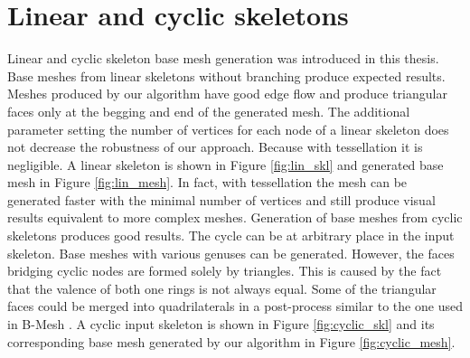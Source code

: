 \section{Linear and cyclic skeletons}

Linear and cyclic skeleton base mesh generation was introduced in this thesis.
Base meshes from linear skeletons without branching produce expected results.
Meshes produced by our algorithm have good edge flow and produce triangular faces only at the begging and end of the generated mesh.
The additional parameter setting the number of vertices for each node of a linear skeleton does not decrease the robustness of our approach.
Because with tessellation it is negligible.
A linear skeleton is shown in Figure \ref{fig:lin_skl} and generated base mesh in Figure \ref{fig:lin_mesh}.
In fact, with tessellation the mesh can be generated faster with the minimal number of vertices and still produce visual results equivalent to more complex meshes.
Generation of base meshes from cyclic skeletons produces good results.
The cycle can be at arbitrary place in the input skeleton.
Base meshes with various genuses can be generated.
However, the faces bridging cyclic nodes are formed solely by triangles.
This is caused by the fact that the valence of both one rings is not always equal.
Some of the triangular faces could be merged into quadrilaterals in a post-process similar to the one used in B-Mesh \cite{ji_bm}.
A cyclic input skeleton is shown in Figure \ref{fig:cyclic_skl} and its corresponding base mesh generated by our algorithm in Figure \ref{fig:cyclic_mesh}.

